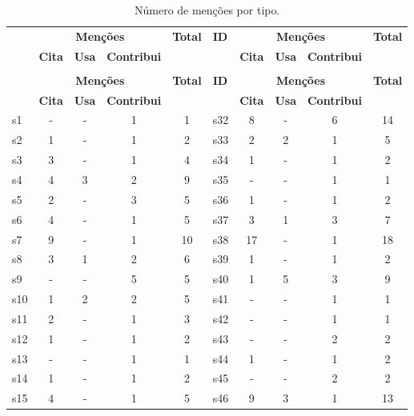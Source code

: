 \begin{longtable}{ l c c c c | l c c c c }
\caption{Número de menções por tipo.}
\label{mentions-table} \\
  \hline
  \hhline{ l c c c c | l c c c c |}
  \endfirsthead
  \hhline{ l c c c c | l c c c c |}
  \hline
   \multirow{2}{*}{\textbf{ID}} & \multicolumn{3}{c}{{\bf Menções}} & \multirow{2}{*}{\textbf{Total}} & \multirow{2}{*}{\textbf{ID}} & \multicolumn{3}{c}{{\bf Menções}} & \multirow{2}{*}{\textbf{Total}} \\
   & \textbf{Cita} & \textbf{Usa} & \textbf{Contribui} & & & \textbf{Cita} & \textbf{Usa} & \textbf{Contribui} & \\
  \hline
  \hhline{ l c c c c | l c c c c |}
  \endhead
  \hhline{-----|-----}
  \multicolumn{10}{c}{continua na próxima página} \\
  \hhline{-----|-----} \endfoot
  \hhline{-----|-----} \endlastfoot
   \multirow{2}{*}{\textbf{ID}} & \multicolumn{3}{c}{{\bf Menções}} & \multirow{2}{*}{\textbf{Total}} & \multirow{2}{*}{\textbf{ID}} & \multicolumn{3}{c}{{\bf Menções}} & \multirow{2}{*}{\textbf{Total}} \\
   & \textbf{Cita} & \textbf{Usa} & \textbf{Contribui} & & & \textbf{Cita} & \textbf{Usa} & \textbf{Contribui} & \\
  \hline
s1 & - & - & 1 & 1 & s32 & 8 & - & 6 & 14 \\
s2 & 1 & - & 1 & 2 & s33 & 2 & 2 & 1 & 5 \\
s3 & 3 & - & 1 & 4 & s34 & 1 & - & 1 & 2 \\
s4 & 4 & 3 & 2 & 9 & s35 & - & - & 1 & 1 \\
s5 & 2 & - & 3 & 5 & s36 & 1 & - & 1 & 2 \\
s6 & 4 & - & 1 & 5 & s37 & 3 & 1 & 3 & 7 \\
s7 & 9 & - & 1 & 10 & s38 & 17 & - & 1 & 18 \\
s8 & 3 & 1 & 2 & 6 & s39 & 1 & - & 1 & 2 \\
s9 & - & - & 5 & 5 & s40 & 1 & 5 & 3 & 9 \\
s10 & 1 & 2 & 2 & 5 & s41 & - & - & 1 & 1 \\
s11 & 2 & - & 1 & 3 & s42 & - & - & 1 & 1 \\
s12 & 1 & - & 1 & 2 & s43 & - & - & 2 & 2 \\
s13 & - & - & 1 & 1 & s44 & 1 & - & 1 & 2 \\
s14 & 1 & - & 1 & 2 & s45 & - & - & 2 & 2 \\
s15 & 4 & - & 1 & 5 & s46 & 9 & 3 & 1 & 13 \\

\end{longtable}
